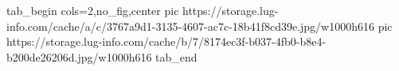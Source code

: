  
 
 
 
 


\ifcmt
  tab_begin cols=2,no_fig,center
     pic https://storage.lug-info.com/cache/a/c/3767a9d1-3135-4607-ac7c-18b41f8cd39e.jpg/w1000h616
		 pic https://storage.lug-info.com/cache/b/7/8174ec3f-b037-4fb0-b8e4-b200de26206d.jpg/w1000h616
  tab_end
\fi
